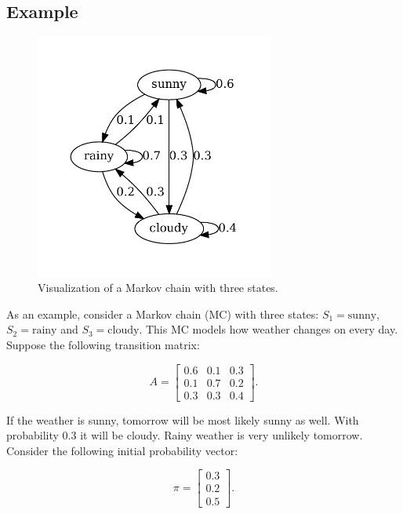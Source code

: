 \documentclass[thesis=B,english]{FITthesis}[2012/06/26]
\begin{document}
\subsection{Example}

\begin{figure}
	\centering
 	\includegraphics[width=0.7\textwidth]{mc}
 	\caption{Visualization of a Markov chain with three states.}
 	\label{fig:mc}
\end{figure}

As an example, consider a Markov chain (MC) with three states: $S_1 = \text{sunny}$, $S_2 = \text{rainy}$ and $S_3 = \text{cloudy}$. This MC models how weather changes on every day. Suppose the following transition matrix:

\begin{equation}
A =
\begin{bmatrix}
	0.6	& 0.1 & 0.3 \\
	0.1 & 0.7 & 0.2 \\
	0.3 & 0.3 & 0.4
\end{bmatrix}.
\end{equation}

If the weather is sunny, tomorrow will be most likely sunny as well. With probability 0.3 it will be cloudy. Rainy weather is very unlikely tomorrow. Consider the following initial probability vector:

\begin{equation}
\pi = \begin{bmatrix} 0.3 \\ 0.2 \\ 0.5 \end{bmatrix}.
\end{equation}
\end{document}

